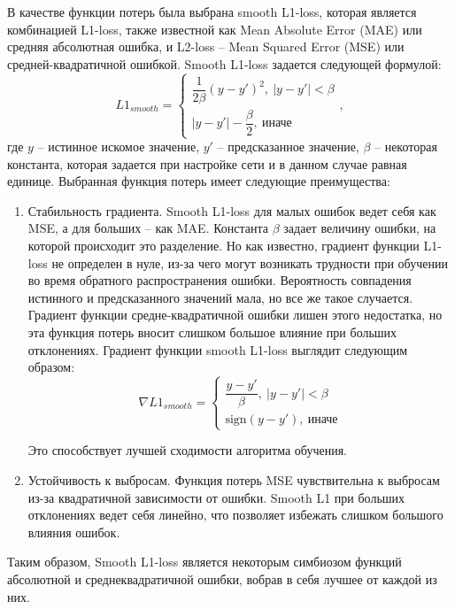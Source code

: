 В качестве функции потерь была выбрана smooth L1-loss, которая является комбинацией L1-loss, также известной как Mean Absolute Error (MAE) или средняя абсолютная ошибка, и L2-loss -- Mean Squared Error (MSE) или средней-квадратичной ошибкой. Smooth L1-loss задается следующей формулой:
\begin{equation}
	L1_{smooth} =
	\begin{cases}
		\dfrac{1}{2\beta}(y-y')^2,\ |y-y'|<\beta \\
		|y-y'| - \dfrac{\beta}{2},\ \text{иначе}
	\end{cases},
\end{equation}
где $y$ -- истинное искомое значение, $y'$ -- предсказанное значение, $\beta$ -- некоторая константа, которая задается при настройке сети и в данном случае равная единице. Выбранная функция потерь имеет следующие преимущества:
\begin{enumerate}[1.]
	\item Стабильность градиента. Smooth L1-loss для малых ошибок ведет себя как MSE, а для больших -- как MAE. Константа $\beta$ задает величину ошибки, на которой происходит это разделение. Но как известно, градиент функции L1-loss не определен в нуле, из-за чего могут возникать трудности при обучении во время обратного распространения ошибки. Вероятность совпадения истинного и предсказанного значений мала, но все же такое случается. Градиент функции средне-квадратичной ошибки лишен этого недостатка, но эта функция потерь вносит слишком большое влияние при больших отклонениях. Градиент функции smooth L1-loss выглядит следующим образом:
	\begin{equation}
		\nabla L1_{smooth} = 
		\begin{cases}
			\dfrac{y-y'}{\beta},\ |y-y'|<\beta \\
			\text{sign}(y-y'),\ \text{иначе}
		\end{cases}
	\end{equation}
	
	Это способствует лучшей сходимости алгоритма обучения.
	
	\item Устойчивость к выбросам. Функция потерь MSE чувствительна к выбросам из-за квадратичной зависимости от ошибки. Smooth L1 при больших отклонениях ведет себя линейно, что позволяет избежать слишком большого влияния ошибок.
\end{enumerate}

Таким образом, Smooth L1-loss является некоторым симбиозом функций абсолютной и среднеквадратичной ошибки, вобрав в себя лучшее от каждой из них.

